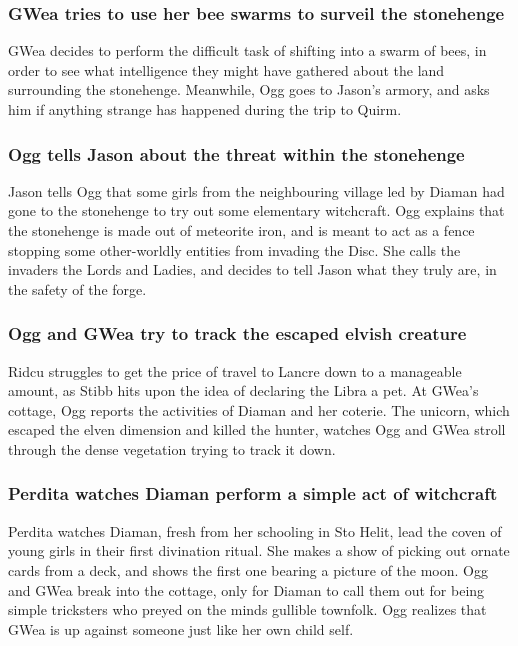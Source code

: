 \subsubsection{\Gls{GWea} tries to use her bee swarms to surveil the stonehenge}
\Gls{GWea} decides to perform the difficult task of shifting into a swarm of bees, in order to
see what intelligence they might have gathered about the land surrounding the stonehenge. Meanwhile,
\Gls{Ogg} goes to \Gls{Jason}'s armory, and asks him if anything strange has happened during the
trip to Quirm.

\subsubsection{\Gls{Ogg} tells \Gls{Jason} about the threat within the stonehenge}
\Gls{Jason} tells \Gls{Ogg} that some girls from the neighbouring village led by \Gls{Diaman} had
gone to the stonehenge to try out some elementary witchcraft. \Gls{Ogg} explains that the stonehenge
is made out of meteorite iron, and is meant to act as a fence stopping some other-worldly entities
from invading the Disc. She calls the invaders the Lords and Ladies, and decides to tell \Gls{Jason}
what they truly are, in the safety of the forge.

\subsubsection{\Gls{Ogg} and \Gls{GWea} try to track the escaped elvish creature}
\Gls{Ridcu} struggles to get the price of travel to Lancre down to a manageable amount, as
\Gls{Stibb} hits upon the idea of declaring the \Gls{Libra} a pet. At \Gls{GWea}'s cottage,
\Gls{Ogg} reports the activities of \Gls{Diaman} and her coterie. The unicorn, which escaped the
elven dimension and killed the hunter, watches \Gls{Ogg} and \Gls{GWea} stroll through the dense
vegetation trying to track it down.

\subsubsection{\Gls{Perdita} watches \Gls{Diaman} perform a simple act of witchcraft}
\Gls{Perdita} watches \Gls{Diaman}, fresh from her schooling in Sto Helit, lead the coven of young
girls in their first divination ritual. She makes a show of picking out ornate cards from a deck,
and shows the first one bearing a picture of the moon. \Gls{Ogg} and \Gls{GWea} break into the
cottage, only for \Gls{Diaman} to call them out for being simple tricksters who preyed on the minds
gullible townfolk. \Gls{Ogg} realizes that \Gls{GWea} is up against someone just like her own child
self.


